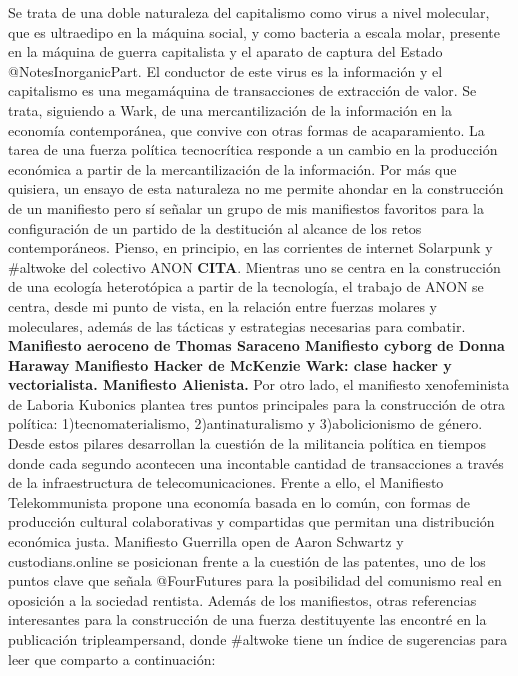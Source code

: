 \documentclass[
]{article}
\begin{document}
Se trata de una doble naturaleza del capitalismo como virus a nivel
molecular, que es ultraedipo en la máquina social, y como bacteria a
escala molar, presente en la máquina de guerra capitalista y el aparato
de captura del Estado @NotesInorganicPart. El conductor de este virus es
la información y el capitalismo es una megamáquina de transacciones de
extracción de valor. Se trata, siguiendo a Wark, de una mercantilización
de la información en la economía contemporánea, que convive con otras
formas de acaparamiento. La tarea de una fuerza política tecnocrítica
responde a un cambio en la producción económica a partir de la
mercantilización de la información. Por más que quisiera, un ensayo de
esta naturaleza no me permite ahondar en la construcción de un
manifiesto pero sí señalar un grupo de mis manifiestos favoritos para la
configuración de un partido de la destitución al alcance de los retos
contemporáneos. Pienso, en principio, en las corrientes de internet
Solarpunk y \#altwoke del colectivo ANON \textbf{CITA}. Mientras uno se
centra en la construcción de una ecología heterotópica a partir de la
tecnología, el trabajo de ANON se centra, desde mi punto de vista, en la
relación entre fuerzas molares y moleculares, además de las tácticas y
estrategias necesarias para combatir. \textbf{Manifiesto aeroceno de
Thomas Saraceno Manifiesto cyborg de Donna Haraway Manifiesto Hacker de
McKenzie Wark: clase hacker y vectorialista. Manifiesto Alienista.} Por
otro lado, el manifiesto xenofeminista de Laboria Kubonics plantea tres
puntos principales para la construcción de otra política:
1)tecnomaterialismo, 2)antinaturalismo y 3)abolicionismo de género.
Desde estos pilares desarrollan la cuestión de la militancia política en
tiempos donde cada segundo acontecen una incontable cantidad de
transacciones a través de la infraestructura de telecomunicaciones.
Frente a ello, el Manifiesto Telekommunista propone una economía basada
en lo común, con formas de producción cultural colaborativas y
compartidas que permitan una distribución económica justa. Manifiesto
Guerrilla open de Aaron Schwartz y custodians.online se posicionan
frente a la cuestión de las patentes, uno de los puntos clave que señala
@FourFutures para la posibilidad del comunismo real en oposición a la
sociedad rentista. Además de los manifiestos, otras referencias
interesantes para la construcción de una fuerza destituyente las
encontré en la publicación tripleampersand, donde \#altwoke tiene un
índice de sugerencias para leer que comparto a continuación:
\end{document}
